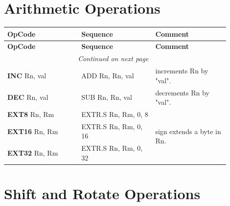 \section*{Arithmetic Operations}

\begin{longtable}{@{}p{0.3\linewidth}p{0.3\linewidth}p{0.3\linewidth}@{}}
    \toprule
    \textbf{OpCode} & \textbf{Sequence} & \textbf{Comment} \\
    \midrule
    \endfirsthead

    \toprule
    \textbf{OpCode} & \textbf{Sequence} & \textbf{Comment} \\
    \midrule
    \endhead

    \midrule
    \multicolumn{2}{r}{\textit{Continued on next page}} \\
    \midrule
    \endfoot

    \bottomrule
    \endlastfoot

    \textbf{INC} Rn, val  & ADD Rn, Rn, val & increments Rn by "val". \\
    \midrule
    \textbf{DEC} Rn, val  & SUB Rn, Rn, val & decrements Rn  by "val". \\
    \midrule

    \textbf{EXT8}  Rn, Rm & EXTR.S Rn, Rm, 0, 8    & \multirow{3}{*}{sign extends a byte in Rn.} \\
    \textbf{EXT16} Rn, Rm & EXTR.S Rn, Rm, 0, 16   &  \\
    \textbf{EXT32} Rn, Rm & EXTR.S Rn, Rm, 0, 32   &  \\
    \midrule

\end{longtable}



\section*{Shift and Rotate Operations}

